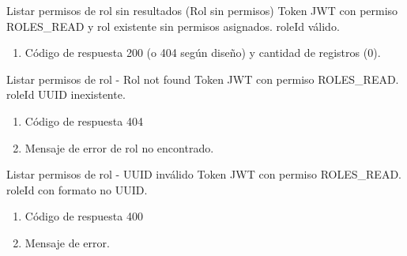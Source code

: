 {Listar permisos de rol sin resultados (Rol sin permisos)}
{Token JWT con permiso ROLES\_READ y rol existente sin permisos asignados.}
{roleId válido.}
{\begin{enumerate} [leftmargin=*, nosep]
    \item Código de respuesta 200 (o 404 según diseño) y cantidad de registros (0).
\end{enumerate}}

{Listar permisos de rol - Rol not found}
{Token JWT con permiso ROLES\_READ.}
{roleId UUID inexistente.}
{\begin{enumerate} [leftmargin=*, nosep]
    \item Código de respuesta 404
    \item Mensaje de error de rol no encontrado.
\end{enumerate}}

{Listar permisos de rol - UUID inválido}
{Token JWT con permiso ROLES\_READ.}
{roleId con formato no UUID.}
{\begin{enumerate} [leftmargin=*, nosep]
    \item Código de respuesta 400
    \item Mensaje de error.
\end{enumerate}}

